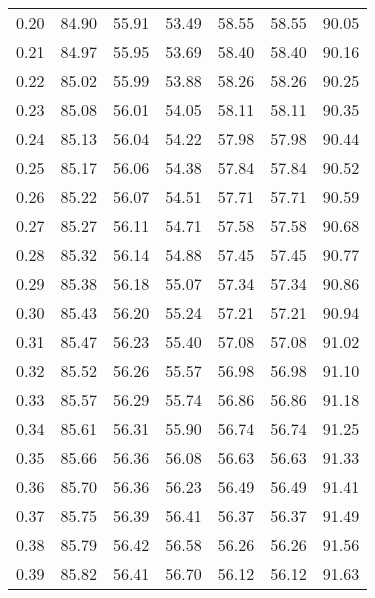 \begin{tabular}{|c|c|c|c|c|c|c|}
      0.20 &     84.90 &     55.91 &      53.49 &   58.55 &      58.55 &         90.05 \\
      0.21 &     84.97 &     55.95 &      53.69 &   58.40 &      58.40 &         90.16 \\
      0.22 &     85.02 &     55.99 &      53.88 &   58.26 &      58.26 &         90.25 \\
      0.23 &     85.08 &     56.01 &      54.05 &   58.11 &      58.11 &         90.35 \\
      0.24 &     85.13 &     56.04 &      54.22 &   57.98 &      57.98 &         90.44 \\
      0.25 &     85.17 &     56.06 &      54.38 &   57.84 &      57.84 &         90.52 \\
      0.26 &     85.22 &     56.07 &      54.51 &   57.71 &      57.71 &         90.59 \\
      0.27 &     85.27 &     56.11 &      54.71 &   57.58 &      57.58 &         90.68 \\
      0.28 &     85.32 &     56.14 &      54.88 &   57.45 &      57.45 &         90.77 \\
      0.29 &     85.38 &     56.18 &      55.07 &   57.34 &      57.34 &         90.86 \\
      0.30 &     85.43 &     56.20 &      55.24 &   57.21 &      57.21 &         90.94 \\
      0.31 &     85.47 &     56.23 &      55.40 &   57.08 &      57.08 &         91.02 \\
      0.32 &     85.52 &     56.26 &      55.57 &   56.98 &      56.98 &         91.10 \\
      0.33 &     85.57 &     56.29 &      55.74 &   56.86 &      56.86 &         91.18 \\
      0.34 &     85.61 &     56.31 &      55.90 &   56.74 &      56.74 &         91.25 \\
      0.35 &     85.66 &     56.36 &      56.08 &   56.63 &      56.63 &         91.33 \\
      0.36 &     85.70 &     56.36 &      56.23 &   56.49 &      56.49 &         91.41 \\
      0.37 &     85.75 &     56.39 &      56.41 &   56.37 &      56.37 &         91.49 \\
      0.38 &     85.79 &     56.42 &      56.58 &   56.26 &      56.26 &         91.56 \\
      0.39 &     85.82 &     56.41 &      56.70 &   56.12 &      56.12 &         91.63 \\

\end{tabular}
